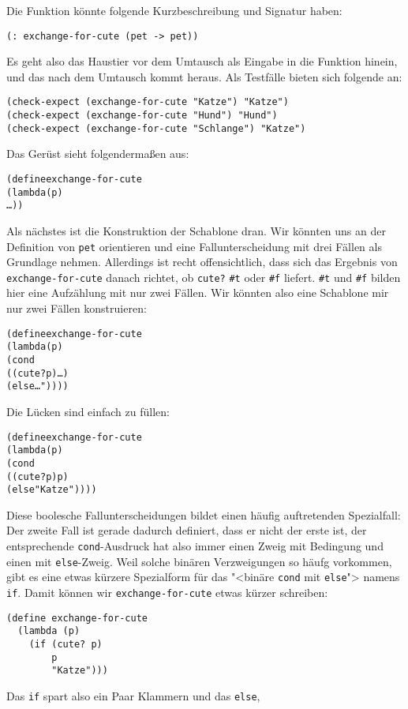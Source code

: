 Die Funktion könnte folgende Kurzbeschreibung und Signatur
haben:
%
\begin{verbatim}
(: exchange-for-cute (pet -> pet))
\end{verbatim}
%
Es geht also das Haustier vor dem Umtausch als Eingabe in die Funktion
hinein, und das nach dem Umtausch kommt heraus.  Als Testfälle bieten
sich folgende an:
%
\begin{verbatim}
(check-expect (exchange-for-cute "Katze") "Katze")
(check-expect (exchange-for-cute "Hund") "Hund")
(check-expect (exchange-for-cute "Schlange") "Katze")
\end{verbatim}
%
Das Gerüst sieht folgendermaßen aus:
%
\begin{alltt}
(define exchange-for-cute
  (lambda (p)
    \ldots))
\end{alltt}
%
Als nächstes ist die Konstruktion der Schablone dran.  Wir könnten uns
an der Definition von \texttt{pet} orientieren und eine
Fallunterscheidung mit drei Fällen als Grundlage nehmen.  Allerdings
ist recht offensichtlich, dass sich das Ergebnis von
\texttt{exchange-for-cute} danach richtet, ob \texttt{cute?} \verb|#t|
oder \verb|#f| liefert.   \verb|#t| und \verb|#f| bilden hier eine
Aufzählung mit nur zwei Fällen.  Wir könnten also eine Schablone mir
nur zwei Fällen konstruieren:
%
\begin{alltt}
(define exchange-for-cute
  (lambda (p)
    (cond
      ((cute? p) \ldots)
      (else \ldots"))))
\end{alltt}
%
Die Lücken sind einfach zu füllen:
%
\begin{alltt}
(define exchange-for-cute
  (lambda (p)
    (cond
      ((cute? p) p)
      (else "Katze"))))
\end{alltt}
%
Diese boolesche Fallunterscheidungen bildet einen häufig auftretenden
Spezialfall: Der zweite Fall ist gerade dadurch definiert, dass er
nicht der erste ist, der entsprechende \texttt{cond}-Ausdruck hat also
immer einen Zweig mit Bedingung und einen mit \texttt{else}-Zweig.
Weil solche binären Verzweigungen so häufg vorkommen, gibt es eine
etwas kürzere Spezialform für das "<binäre \texttt{cond} mit
\texttt{else}"> namens \texttt{if}.  Damit
können wir \texttt{exchange-for-cute} etwas kürzer schreiben:
%
\begin{verbatim}
(define exchange-for-cute
  (lambda (p)
    (if (cute? p)
        p
        "Katze")))
\end{verbatim}
%
Das \texttt{if} spart also ein Paar Klammern und das \texttt{else},
